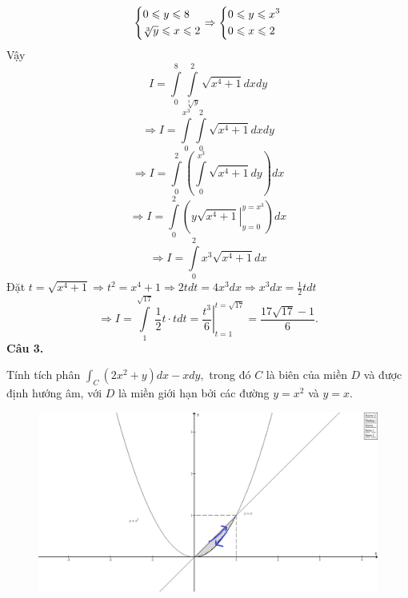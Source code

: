 \documentclass[12pt,a4paper]{article}
\begin{document}
\[\left\{ \begin{gathered}
  0 \leqslant y \leqslant 8 \hfill \\
  \sqrt[3]{y} \leqslant x \leqslant 2 \hfill \\ 
\end{gathered}  \right. \Rightarrow \left\{ \begin{gathered}
  0 \leqslant y \leqslant {x^3} \hfill \\
  0 \leqslant x \leqslant 2 \hfill \\ 
\end{gathered}  \right.\]
Vậy \[I = \int\limits_0^8 {\int\limits_{\sqrt[3]{y}}^2 {\sqrt {{x^4} + 1} dxdy} } \]
\[ \Rightarrow I = \int\limits_0^{{x^3}} {\int\limits_0^2 {\sqrt {{x^4} + 1} dxdy} } \]
\[ \Rightarrow I = \int\limits_0^2 {\left( {\int\limits_0^{{x^3}} {\sqrt {{x^4} + 1} dy} } \right)dx} \]
\[ \Rightarrow I = \int\limits_0^2 {\left( {\left. {y\sqrt {{x^4} + 1} } \right|_{y = 0}^{y = {x^3}}} \right)dx} \]
\[ \Rightarrow I = \int\limits_0^2 {{x^3}\sqrt {{x^4} + 1} dx} \]
Đặt \(t = \sqrt {{x^4} + 1}  \Rightarrow {t^2} = {x^4} + 1 \Rightarrow 2tdt = 4{x^3}dx \Rightarrow {x^3}dx = \frac{1}{2}tdt\)
\[ \Rightarrow I = \int\limits_1^{\sqrt {17} } {\frac{1}{2}t \cdot tdt}  = \left. {\frac{{{t^3}}}{6}} \right|_{t = 1}^{t = \sqrt {17} } = \frac{{17\sqrt {17}  - 1}}{6}.\]
\textbf{Câu 3.}
\begin{mybox}
Tính tích phân \(\int_C {\left( {2{x^2} + y} \right)dx - xdy,} \) trong đó \(C\) là biên của miền \(D\) và được định hướng âm, với \(D\) là miền giới hạn bởi các đường \(y = x^2\) và \(y = x.\)
\end{mybox}
\begin{center}
\begin{figure}[H]
\includegraphics[scale=0.4]{anhgk1}
\end{figure}
\end{center}
\end{document}
